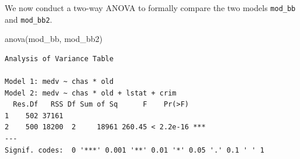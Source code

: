 \documentclass[
  12pt,
  letterpaper,
]{scrbook}
\newenvironment{Shaded}{\begin{snugshade}}{\end{snugshade}}
\newcommand{\FunctionTok}[1]{\textcolor[rgb]{0.28,0.35,0.67}{#1}}
\newcommand{\NormalTok}[1]{\textcolor[rgb]{0.00,0.23,0.31}{#1}}
\theoremstyle{plain}
\theoremstyle{definition}
\theoremstyle{remark}
\begin{document}
We now conduct a two-way ANOVA to formally compare the two models
\texttt{mod\_bb} and \texttt{mod\_bb2}.

\begin{Shaded}
\begin{Highlighting}[]
\FunctionTok{anova}\NormalTok{(mod\_bb, mod\_bb2)}
\end{Highlighting}
\end{Shaded}

\begin{verbatim}
Analysis of Variance Table

Model 1: medv ~ chas * old
Model 2: medv ~ chas * old + lstat + crim
  Res.Df   RSS Df Sum of Sq      F    Pr(>F)    
1    502 37161                                  
2    500 18200  2     18961 260.45 < 2.2e-16 ***
---
Signif. codes:  0 '***' 0.001 '**' 0.01 '*' 0.05 '.' 0.1 ' ' 1
\end{verbatim}
\end{document}
